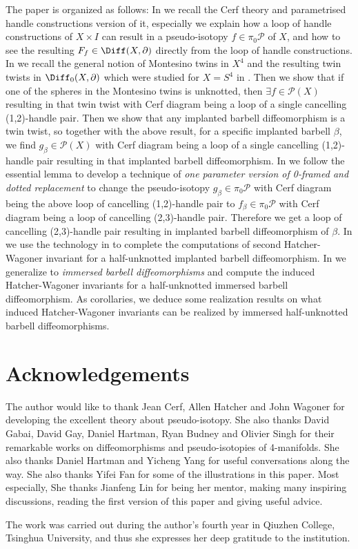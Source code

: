 The paper is organized as follows: In  we recall the Cerf theory and parametrised handle constructions version of it, especially we explain how a loop of handle constructions of $X\times I$ can result in a pseudo-isotopy $f\in \pi_0\mathcal{P}$ of $X$, and how to see the resulting $F_f\in\Diff(X,\partial)$ directly from the loop of handle constructions. In  we recall the general notion of Montesino twins in $X^4$ and the resulting twin twists in $\Diff_0(X,\partial)$ which were studied for $X=S^4$ in \cite{Gay_2025}. Then we show that if one of the spheres in the Montesino twins is unknotted, then $\exists f\in \mathcal{P}(X)$ resulting in that twin twist with Cerf diagram being a loop of a single cancelling (1,2)-handle pair. Then we show that any implanted barbell diffeomorphism is a twin twist, so together with the above result, for a specific implanted barbell $\beta$, we find $g_\beta\in \mathcal{P}(X)$ with Cerf diagram being a loop of a single cancelling (1,2)-handle pair resulting in that implanted barbell diffeomorphism. In  we follow the essential lemma \cite[Lemma 17]{Gay_2025} to develop a technique of \emph{one parameter version of 0-framed and dotted replacement} to change the pseudo-isotopy $g_\beta\in \pi_0\mathcal{P}$ with Cerf diagram being the above loop of cancelling (1,2)-handle pair to $f_\beta\in \pi_0\mathcal{P}$ with Cerf diagram being a loop of cancelling (2,3)-handle pair. Therefore we get a loop of cancelling (2,3)-handle pair resulting in implanted barbell diffeomorphism of $\beta$. In  we use the technology in  to complete the computations of second Hatcher-Wagoner invariant for a half-unknotted implanted barbell diffeomorphism. In  we generalize to \emph{immersed barbell diffeomorphisms} and compute the induced Hatcher-Wagoner invariants for a half-unknotted immersed barbell diffeomorphism. As corollaries, we deduce some realization results on what induced Hatcher-Wagoner invariants can be realized by immersed half-unknotted barbell diffeomorphisms.

\section*{Acknowledgements}
The author would like to thank Jean Cerf, Allen Hatcher and John Wagoner for developing the excellent theory about pseudo-isotopy. She also thanks David Gabai, David Gay, Daniel Hartman, Ryan Budney and Olivier Singh for their remarkable works on diffeomorphisms and pseudo-isotopies of 4-manifolds. She also thanks Daniel Hartman and Yicheng Yang for useful conversations along the way. She also thanks Yifei Fan for some of the illustrations in this paper. Most especially, She thanks Jianfeng Lin for being her mentor, making many inspiring discussions,  reading the first version of this paper and giving useful advice. 

The work was carried out during the author's fourth year in Qiuzhen College, Tsinghua University, and thus she expresses her deep gratitude to the institution.
